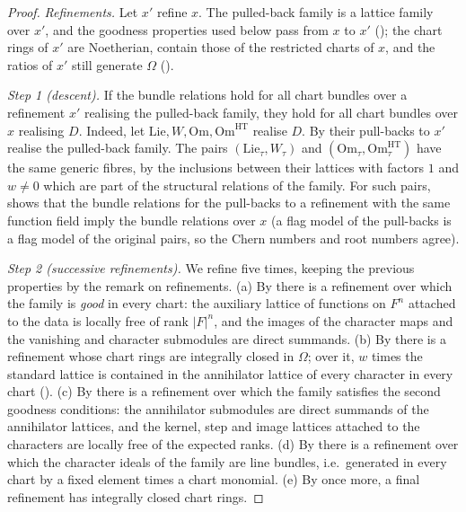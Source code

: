 \begin{proof}
\emph{Refinements.} Let $x'$ refine $x$. The pulled-back family is a lattice family over $x'$, and the goodness
properties used below pass from $x$ to $x'$ (); the chart
rings of $x'$ are Noetherian, contain those of the restricted charts of $x$, and the ratios of $x'$ still generate
$\Omega$ ().

\emph{Step 1 (descent).} If the bundle relations hold for all chart bundles over a refinement $x'$ realising the
pulled-back family, they hold for all chart bundles over $x$ realising $D$. Indeed, let
$\mathrm{Lie},W,\mathrm{Om},\mathrm{Om}^{\mathrm{HT}}$ realise $D$. By
 their pull-backs to $x'$ realise the pulled-back family.
The pairs $(\mathrm{Lie}_\tau,W_\tau)$ and $(\mathrm{Om}_\tau,\mathrm{Om}^{\mathrm{HT}}_\tau)$ have the same generic
fibres, by the inclusions between their lattices with factors $1$ and $w\ne0$ which are part of the structural
relations of the family. For such pairs,  shows that
the bundle relations for the pull-backs to a refinement with the same function field imply the bundle relations
over $x$ (a flag model of the pull-backs is a flag model of the original pairs, so the Chern numbers and root
numbers agree).

\emph{Step 2 (successive refinements).} We refine five times, keeping the previous properties by the remark on
refinements. (a) By  there is a refinement over which the
family is \emph{good} in every chart: the auxiliary lattice of functions on $F^n$ attached to the data is locally
free of rank $|F|^n$, and the images of the character maps and the vanishing and character submodules are direct
summands. (b) By  there is a refinement whose chart rings are
integrally closed in $\Omega$; over it, $w$ times the standard lattice is contained in the annihilator lattice of
every character in every chart (). (c) By
 there is a refinement over which the family satisfies
the second goodness conditions: the annihilator submodules are direct summands of the annihilator lattices, and the
kernel, step and image lattices attached to the characters are locally free of the expected ranks. (d) By
 there is a refinement over which the character ideals of the
family are line bundles, i.e.\ generated in every chart by a fixed element times a chart monomial. (e) By
 once more, a final refinement has integrally closed chart rings.


\end{proof}
